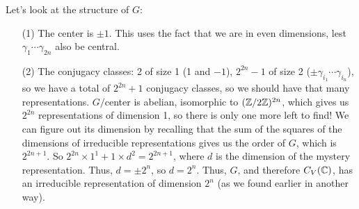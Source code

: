  Let's look at the structure of $G$:
 \begin{itemize}
 \item[(1)] The center is $\pm 1$. This uses the fact that we are in even dimensions,
 lest $\gamma_1\cdots \gamma_{2n}$ also be central.

 \item[(2)] The conjugacy classes: 2 of size 1 (1 and $-1$), $2^{2n}-1$ of size 2
 ($\pm \gamma_{i_1}\cdots \gamma_{i_{n}}$), so we have a total of $2^{2n}+1$ conjugacy
 classes, so we should have that many representations. $G/$center is abelian,
 isomorphic to $(\mathbb{Z}/2\mathbb{Z})^{2n}$, which gives us $2^{2n}$ representations of dimension 1, so there is
 only one more left to find! We can figure out its dimension by recalling that the sum
 of the squares of the dimensions of irreducible representations gives us the order of
 $G$, which is $2^{2n+1}$. So $2^{2n}\times 1^1+1\times d^2=2^{2n+1}$, where $d$ is
 the dimension of the mystery representation. Thus, $d=\pm 2^n$, so $d=2^n$. Thus,
 $G$, and therefore $C_V(\mathbb{C})$, has an irreducible representation of dimension $2^n$
 (as we found earlier in another way).
 \end{itemize}

